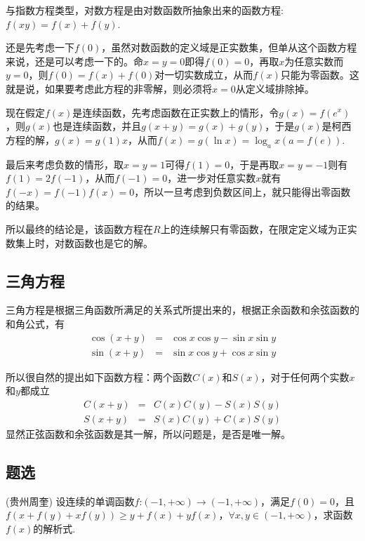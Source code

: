 与指数方程类型，对数方程是由对数函数所抽象出来的函数方程: $f(xy)=f(x)+f(y)$.

还是先考虑一下$f(0)$，虽然对数函数的定义域是正实数集，但单从这个函数方程来说，还是可以考虑一下的。命$x=y=0$即得$f(0)=0$，再取$x$为任意实数而$y=0$，则$f(0)=f(x)+f(0)$对一切实数成立，从而$f(x)$只能为零函数。这就是说，如果要考虑此方程的非零解，则必须将$x=0$从定义域排除掉。

现在假定$f(x)$是连续函数，先考虑函数在正实数上的情形，令$g(x)=f(e^x)$，则$g(x)$也是连续函数，并且$g(x+y)=g(x)+g(y)$，于是$g(x)$是柯西方程的解，$g(x)=g(1)x$，从而$f(x)=g(\ln{x})=\log_a{x}(a=f(e))$.

最后来考虑负数的情形，取$x=y=1$可得$f(1)=0$，于是再取$x=y=-1$则有$f(1)=2f(-1)$，从而$f(-1)=0$，进一步对任意实数$x$就有$f(-x)=f(-1)f(x)=0$，所以一旦考虑到负数区间上，就只能得出零函数的结果。

所以最终的结论是，该函数方程在$R$上的连续解只有零函数，在限定定义域为正实数集上时，对数函数也是它的解。

\subsection{三角方程}
\label{sec:triangle-function-equation}

三角方程是根据三角函数所满足的关系式所提出来的，根据正余函数和余弦函数的和角公式，有
\begin{eqnarray*}
  \cos{(x+y)} & = & \cos{x}\cos{y} - \sin{x}\sin{y} \\
  \sin{(x+y)} & = & \sin{x}\cos{y} + \cos{x}\sin{y}
\end{eqnarray*}

所以很自然的提出如下函数方程：两个函数$C(x)$和$S(x)$，对于任何两个实数$x$和$y$都成立
\begin{eqnarray*}
  C{(x+y)} & = & C(x)C(y) - S(x)S(y) \\
  S{(x+y)} & = & S(x)C(y) + C(x)S(y)
\end{eqnarray*}
显然正弦函数和余弦函数是其一解，所以问题是，是否是唯一解。


\subsection{题选}
\label{sec:exercise-for-function-equation}

\begin{exercise}
  (贵州周奎)
  设连续的单调函数$f$:$(-1,+\infty) \to (-1,+\infty)$，满足$f(0)=0$，且$f(x+f(y)+xf(y)) \geqslant y+f(x)+yf(x)$，$\forall x,y \in (-1,+\infty)$，求函数$f(x)$的解析式.
\end{exercise}

